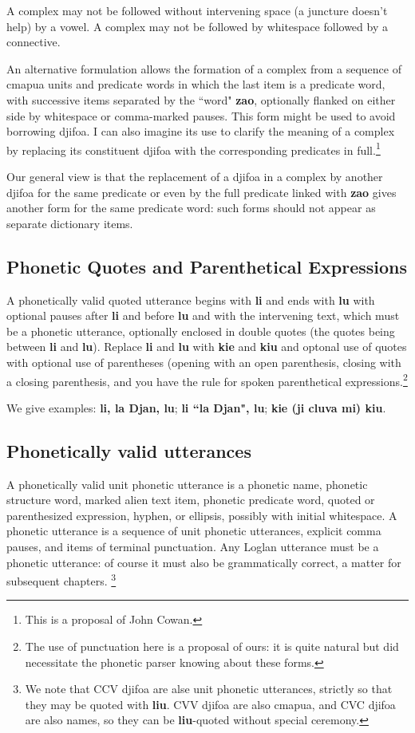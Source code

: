 \documentclass[12pt]{book}
\begin{document}
{A complex may not be followed without intervening space (a juncture doesn't help) by a vowel.  A complex may not be followed by whitespace followed by a connective.

An alternative formulation allows the formation of a complex from a sequence of cmapua units and predicate words in which the last item is a predicate word, with successive items 
separated by the ``word" {\bf zao}, optionally flanked on either side by whitespace or comma-marked pauses.  This form might be used to avoid borrowing djifoa.  I can also imagine its use to clarify the meaning of a complex by replacing its constituent djifoa with the corresponding predicates in full.\footnote{This is a proposal of John Cowan.}

Our general view is that the replacement of a djifoa in a complex by another djifoa for the same predicate or even by the full predicate linked with {\bf zao} gives another form for the same predicate word:  such forms should not appear as separate dictionary items.

\subsection{Phonetic Quotes and Parenthetical Expressions}

A phonetically valid quoted utterance begins with {\bf li} and ends with {\bf lu} with optional pauses after {\bf li} and before {\bf lu} and with the intervening text, which must be a phonetic utterance, optionally enclosed in double quotes (the quotes being between {\bf li} and {\bf lu}).  Replace {\bf li} and {\bf lu} with {\bf kie} and {\bf kiu} and optonal use of quotes with optional use of parentheses (opening with an open parenthesis, closing with a closing parenthesis, and you have the rule for spoken parenthetical expressions.\footnote{The use of punctuation here is a proposal of ours:  it is quite natural but did necessitate the phonetic parser knowing about these forms.}

We give examples:  {\bf li, la Djan, lu}; {\bf li ``la Djan", lu}; {\bf kie (ji cluva mi) kiu}.

\subsection{Phonetically valid utterances}

A phonetically valid unit phonetic utterance is a  phonetic name, phonetic structure word, marked alien text item, phonetic predicate word, quoted or parenthesized expression, hyphen, or ellipsis, possibly with initial whitespace.  A phonetic utterance is a sequence of unit phonetic utterances, explicit comma pauses, and items of terminal punctuation.  Any Loglan utterance must be a phonetic utterance:  of course it must also be grammatically correct, a matter for subsequent chapters.  \footnote{We note that CCV djifoa are alse unit phonetic utterances, strictly so that they may be quoted with {\bf liu}.  CVV djifoa are also cmapua, and CVC djifoa are also names, so they can be {\bf liu}-quoted without special ceremony.}

}
\end{document}
